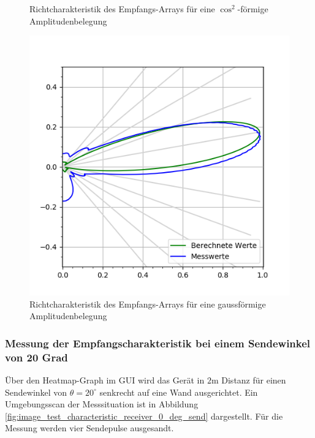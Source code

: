 \begin{figure}[htb]
\begin{minipage}{0.5\textwidth}
\caption{Richtcharakteristik des Empfangs-Arrays für eine $\cos^{2}$-förmige Amplitudenbelegung} %
\label{fig:plot_test_characteristic_receiver_10_deg_send_rect_receive_cos2_4_bursts}
%
\end{minipage}
\begin{minipage}{0.5\textwidth}
\includegraphics[width=\textwidth]{graphics/plot_test_characteristic_receiver_10_deg_send_rect_receive_gauss_4_bursts.png}
\caption{Richtcharakteristik des Empfangs-Arrays für eine gaussförmige Amplitudenbelegung} %
\label{fig:plot_test_characteristic_receiver_10_deg_send_rect_receive_gauss_4_bursts}
%
\end{minipage}
\end{figure}

\clearpage


\subsubsection{Messung der Empfangscharakteristik bei einem Sendewinkel von 20 Grad}
Über den Heatmap-Graph im GUI wird das Gerät in $2 \mathrm{m}$ Distanz für einen Sendewinkel von $\theta = 20^{\circ}$ senkrecht auf eine Wand ausgerichtet. Ein Umgebungsscan der Messsituation ist in Abbildung \ref{fig:image_test_characteristic_receiver_0_deg_send} dargestellt. Für die Messung werden vier Sendepulse ausgesandt.

